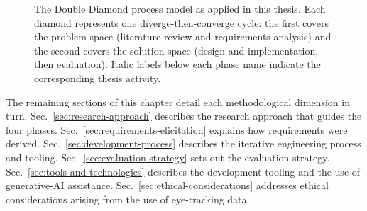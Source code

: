 \begin{figure}[htbp]
{%
}
\caption[The Double Diamond process model as applied in this thesis.]{%
The Double Diamond process model \cite{designcouncil2023diamond} as applied in this thesis.
Each diamond represents one diverge-then-converge cycle:
the first covers the problem space (literature review and requirements analysis)
and the second covers the solution space (design and implementation, then evaluation).
Italic labels below each phase name indicate the corresponding thesis activity.%
}
\label{fig:double-diamond}
\end{figure}

The remaining sections of this chapter detail each methodological dimension in turn.
Sec.~\ref{sec:research-approach} describes the research approach that guides the four phases.
Sec.~\ref{sec:requirements-elicitation} explains how requirements were derived.
Sec.~\ref{sec:development-process} describes the iterative engineering process and tooling.
Sec.~\ref{sec:evaluation-strategy} sets out the evaluation strategy.
Sec.~\ref{sec:tools-and-technologies} describes the development tooling and the use of generative-AI assistance.
Sec.~\ref{sec:ethical-considerations} addresses ethical considerations arising from the use of eye-tracking data.








